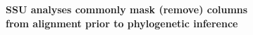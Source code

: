 \documentclass[landscape]{slides}
\begin{document}
\begin{slide}
\begin{center}
\textbf{SSU analyses commonly mask (remove) columns \\ from alignment
  prior to phylogenetic inference}
\end{center}


\vfill
\end{slide}
\end{document}
